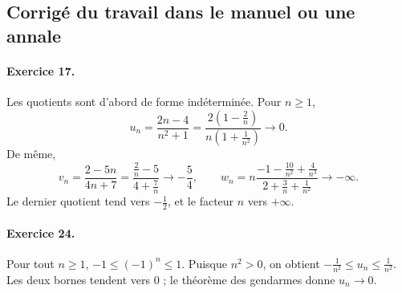 \subsection{Corrigé du travail dans le manuel ou une annale}\paragraph{Exercice 17.} Les quotients sont d'abord de forme indéterminée. Pour $n\ge1$,
\[u_n=\frac{2n-4}{n^2+1}=\frac{2\left(1-\frac2n\right)}{n\left(1+\frac1{n^2}\right)}\longrightarrow0.\]
De même,
\[v_n=\frac{2-5n}{4n+7}=\frac{\frac2n-5}{4+\frac7n}\longrightarrow-\frac54,\qquad w_n=n\frac{-1-\frac{10}{n^2}+\frac4{n^3}}{2+\frac3n+\frac1{n^2}}\longrightarrow-\infty.\]
Le dernier quotient tend vers $-\frac12$, et le facteur $n$ vers $+\infty$.
\paragraph{Exercice 24.} Pour tout $n\ge1$, $-1\le(-1)^n\le1$. Puisque $n^2>0$, on obtient $-\frac1{n^2}\le u_n\le\frac1{n^2}$. Les deux bornes tendent vers $0$ ; le théorème des gendarmes donne $u_n\to0$.

\fi


